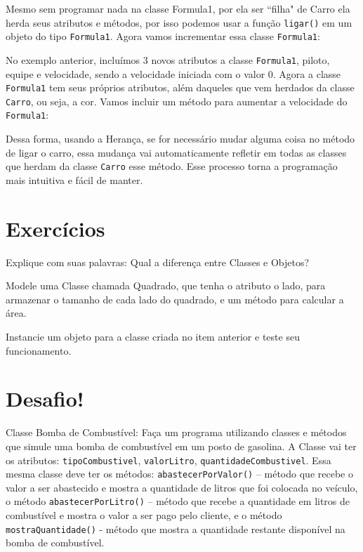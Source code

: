 

Mesmo sem programar nada na classe Formula1, por ela ser ``filha" de Carro ela herda 
seus atributos e métodos, por isso podemos usar a função \texttt{ligar()} em um objeto do tipo 
\texttt{Formula1}. Agora vamos incrementar essa classe \texttt{Formula1}:



No exemplo anterior, incluímos 3 novos atributos a classe \texttt{Formula1}, piloto, equipe e velocidade, 
sendo a velocidade iniciada com o valor 0. Agora a classe \texttt{Formula1} tem seus próprios atributos, 
além daqueles que vem herdados da classe \texttt{Carro}, ou seja, a cor. Vamos incluir um método para 
aumentar a velocidade do \texttt{Formula1}:



Dessa forma, usando a Herança, se for necessário mudar alguma coisa no método de ligar o carro, 
essa mudança vai automaticamente refletir em todas as classes que herdam da classe \texttt{Carro} 
esse método. Esse processo torna a programação mais intuitiva e fácil de manter. 

\section{Exercícios}
\label{cap12-exercicios}

\begin{description}[labelindent=30pt]
  \item [Q. 01] Explique com suas palavras: Qual a diferença entre Classes e Objetos?  
  \item [Q. 02] Modele uma Classe chamada Quadrado, que tenha o atributo o lado, para armazenar o 
  tamanho de cada lado do quadrado, e um método para calcular a área. 
  \item [Q. 03] Instancie um objeto para a classe criada no item anterior e teste seu funcionamento.

\end{description}

\section{Desafio!}
\label{cap12-desafio}

Classe Bomba de Combustível: Faça um programa utilizando classes e métodos que simule uma bomba de 
combustível em um posto de gasolina. A Classe vai ter os atributos: \texttt{tipoCombustivel}, 
\texttt{valorLitro}, \texttt{quantidadeCombustivel}. Essa mesma classe deve ter os métodos: 
\texttt{abastecerPorValor()} – método que recebe o valor a ser abastecido e mostra a 
quantidade de litros que foi colocada no veículo, o método \texttt{abastecerPorLitro()} – 
método que recebe a quantidade em litros de combustível e mostra o valor a ser pago pelo cliente, 
e o método \texttt{mostraQuantidade()} - método que mostra a quantidade restante disponível na 
bomba de combustível. 